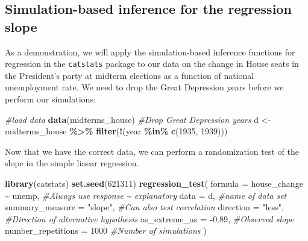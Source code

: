 \documentclass[
  10pt,
  openany]{book}
\newenvironment{Shaded}{\begin{snugshade}}{\end{snugshade}}
\newcommand{\AttributeTok}[1]{\textcolor[rgb]{0.13,0.29,0.53}{#1}}
\newcommand{\CommentTok}[1]{\textcolor[rgb]{0.56,0.35,0.01}{\textit{#1}}}
\newcommand{\DecValTok}[1]{\textcolor[rgb]{0.00,0.00,0.81}{#1}}
\newcommand{\FloatTok}[1]{\textcolor[rgb]{0.00,0.00,0.81}{#1}}
\newcommand{\FunctionTok}[1]{\textcolor[rgb]{0.13,0.29,0.53}{\textbf{#1}}}
\newcommand{\NormalTok}[1]{#1}
\newcommand{\OtherTok}[1]{\textcolor[rgb]{0.56,0.35,0.01}{#1}}
\newcommand{\SpecialCharTok}[1]{\textcolor[rgb]{0.81,0.36,0.00}{\textbf{#1}}}
\newcommand{\StringTok}[1]{\textcolor[rgb]{0.31,0.60,0.02}{#1}}
\theoremstyle{definition}
\theoremstyle{definition}
\theoremstyle{definition}
\theoremstyle{definition}
\theoremstyle{remark}
\begin{document}
\subsection*{Simulation-based inference for the regression slope}\label{simulation-based-inference-for-the-regression-slope}

As a demonstration, we will apply the simulation-based inference functions for regression in the \texttt{catstats} package to our data on the change in House seats in the President's party at midterm elections as a function of national unemployment rate. We need to drop the Great Depression years before we perform our simulations:

\begin{Shaded}
\begin{Highlighting}[]
\CommentTok{\#load data}
\FunctionTok{data}\NormalTok{(midterms\_house)}
\CommentTok{\#Drop Great Depression years}
\NormalTok{d }\OtherTok{\textless{}{-}}\NormalTok{ midterms\_house }\SpecialCharTok{\%\textgreater{}\%} 
  \FunctionTok{filter}\NormalTok{(}\SpecialCharTok{!}\NormalTok{(year }\SpecialCharTok{\%in\%} \FunctionTok{c}\NormalTok{(}\DecValTok{1935}\NormalTok{, }\DecValTok{1939}\NormalTok{)))}
\end{Highlighting}
\end{Shaded}

Now that we have the correct data, we can perform a randomization test of the slope in the simple linear regression.

\begin{Shaded}
\begin{Highlighting}[]
\FunctionTok{library}\NormalTok{(catstats)}
\FunctionTok{set.seed}\NormalTok{(}\DecValTok{621311}\NormalTok{)}
\FunctionTok{regression\_test}\NormalTok{(}
  \AttributeTok{formula =}\NormalTok{ house\_change }\SpecialCharTok{\textasciitilde{}}\NormalTok{ unemp,  }\CommentTok{\#Always use response \textasciitilde{} explanatory}
  \AttributeTok{data =}\NormalTok{ d,  }\CommentTok{\#name of data set}
  \AttributeTok{summary\_measure =} \StringTok{"slope"}\NormalTok{, }\CommentTok{\#Can also test correlation}
  \AttributeTok{direction =} \StringTok{"less"}\NormalTok{, }\CommentTok{\#Direction of alternative hypothesis}
  \AttributeTok{as\_extreme\_as =} \SpecialCharTok{{-}}\FloatTok{0.89}\NormalTok{, }\CommentTok{\#Observed slope}
  \AttributeTok{number\_repetitions =} \DecValTok{1000}  \CommentTok{\#Number of simulations}
\NormalTok{)}
\end{Highlighting}
\end{Shaded}
\end{document}
